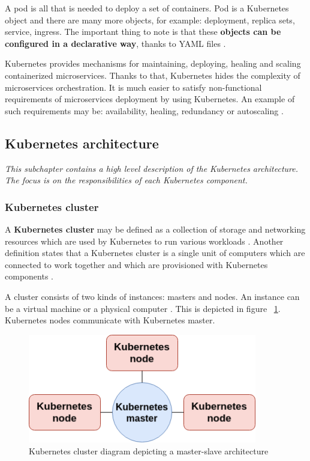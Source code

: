 A pod is all that is needed to deploy a set of containers. Pod is a Kubernetes object and there are many more objects, for example: deployment, replica sets, service, ingress. The important thing to note is that these \textbf{objects can be configured in a declarative way}, thanks to YAML files \cite{k8s-declarative}.

Kubernetes provides mechanisms for maintaining, deploying, healing and scaling containerized microservices. Thanks to that, Kubernetes hides the complexity of microservices orchestration. It is much easier to satisfy non-functional requirements of microservices deployment by using Kubernetes. An example of such requirements may be: availability, healing, redundancy or autoscaling \cite{article-k8s-as-avail}.

\subsection{Kubernetes architecture}
\textit{This subchapter contains a high level description of the Kubernetes architecture. The focus is on the responsibilities of each Kubernetes component.}

\subsubsection{Kubernetes cluster}
A \textbf{Kubernetes cluster} may be defined as a collection of storage and networking resources which are used by Kubernetes to run various workloads \cite{book-mastering-k8s}. Another definition states that a Kubernetes cluster is a single unit of computers which are connected to work together and which are provisioned with Kubernetes components \cite{k8s-cluster}.

A cluster consists of two kinds of instances: masters and nodes. An instance can be a virtual machine or a physical computer \cite{article-k8s-as-avail,k8s-cluster}. This is depicted in figure ~\ref{fig:cluster-k8s}. Kubernetes nodes communicate with Kubernetes master.
\begin{figure}[H]
    \centering
    \includegraphics[width=10cm]{figures/cluster-k8s.png}
    \caption{Kubernetes cluster diagram depicting a master-slave architecture}
    \label{fig:cluster-k8s}
\end{figure}

